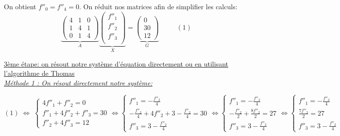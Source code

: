 \documentclass{article}
\begin{document}
On obtient $f''_0=f''_4=0$. On r\'{e}duit nos matrices afin de simplifier les calculs:
\[\underbrace {\begin{pmatrix}
   4 & 1 & 0 \\
   1 & 4 & 1 \\
   0 & 1 & 4  
\end{pmatrix}}_{A}
\underbrace {\begin{pmatrix}
   f''_1 \\
   f''_2 \\
   f''_3 \\
\end{pmatrix}}_{X}
=
\underbrace {\begin{pmatrix}
0\\
30\\
12
\end{pmatrix}}_{G}\;\;\qquad (1)\]

\newpage
\begingroup\raggedleft
\underline{3\`{e}me \'{e}tape: on r\'{e}sout notre syst\`eme d'\'{e}quation directement ou en utilisant l'algorithme de Thomas} 
\\[10pt]
\underline{\textit{M\'{e}thode 1 : On r\'{e}sout directement notre syst\`{e}me:}}
\endgroup

\begin{addmargin}[-6em]{4em}
\[ (1) \; \Leftrightarrow \;\left\{\begin{array}{ll}
4f''_1+f''_2=0\\[5pt]
f''_1+4f''_2+f''_3=30 \\[5pt]
f''_2+4f''_3=12 
 \end{array}\right.
\Leftrightarrow
\left\{\begin{array}{ll}
f''_1=-\frac{f''_2}{4}\\[5pt]
-\frac{f''_2}{4} +4f''_2+3-\frac{f''_2}{4}=30\\[5pt]
f''_3=3-\frac{f''_2}{4}
 \end{array}\right.
\Leftrightarrow
\left\{\begin{array}{ll}
f''_1=-\frac{f''_2}{4}\\[5pt]
-\frac{f''_2}{2} +\frac{8f''_2}{2}=27\\[5pt]
f''_3=3-\frac{f''_2}{4}
\end{array}\right.
\Leftrightarrow
\left\{\begin{array}{ll}
f''_1=-\frac{f''_2}{4}\\[5pt]
\frac{7f''_2}{2}=27\\[5pt]
f''_3=3-\frac{f''_2}{4}
\end{array}\right.\]
\end{addmargin}
\end{document}
